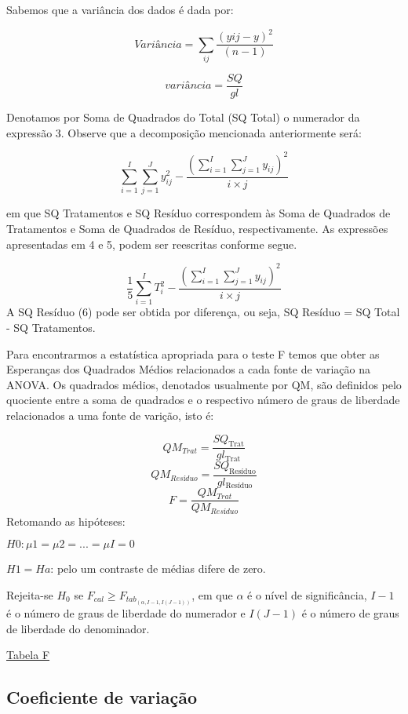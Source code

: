 \documentclass[
]{book}
\begin{document}
Sabemos que a variância dos dados é dada por:

\[Variância = \sum _{ij} \frac{(yij−y)^2}{(n−1)}\]

\[variância = \displaystyle{\frac{SQ}{gl}}\]

Denotamos por Soma de Quadrados do Total (SQ Total) o numerador da expressão 3. Observe que a decomposição mencionada anteriormente será:

\[\displaystyle{\sum_{i=1}^I\sum_{j=1}^Jy_{ij}^2-\frac{\left(\sum_{i=1}^I\sum_{j=1}^Jy_{ij}\right)^2}{i\times j}}\]

em que SQ Tratamentos e SQ Resíduo correspondem às Soma de Quadrados de Tratamentos e Soma de Quadrados de Resíduo, respectivamente.
As expressões apresentadas em 4 e 5, podem ser reescritas conforme segue.

\[\displaystyle{\frac{1}{5}\sum_{i=1}^I T_i^2 - \frac{\left(\sum_{i=1}^I\sum_{j=1}^Jy_{ij}\right)^2}{i\times j}}\]
A SQ Resíduo (6) pode ser obtida por diferença, ou seja,
SQ Resíduo = SQ Total - SQ Tratamentos.

Para encontrarmos a estatística apropriada para o teste F temos que obter as Esperanças dos Quadrados Médios relacionados a cada fonte de variação na ANOVA.
Os quadrados médios, denotados usualmente por QM, são definidos pelo quociente entre a soma de quadrados e o respectivo número de graus de liberdade relacionados a uma fonte de varição, isto é:

\[QM_{Trat} = \displaystyle{\frac{SQ_\text{Trat}}{gl_\text{Trat}}}\]
\[QM_{Resíduo} = \displaystyle{\frac{SQ_\text{Resíduo}}{gl_\text{Resíduo}}}\]
\[F = \displaystyle{\frac{QM_{Trat}}{QM_{Resíduo}}}\]
Retomando as hipóteses:

\(H0 : \mu1 = \mu2 = ... = \mu I = 0\)

\(H1 = Ha\): pelo um contraste de médias difere de zero.

Rejeita-se \(H_0\) se \(F_{cal} \geq F_{tab_{(\alpha, I-1, I(J-1))}}\), em que \(\alpha\) é o nível de significância, \(I-1\) é o número de graus de liberdade do numerador e \(I(J-1)\) é o número de graus de liberdade do denominador.

\href{https://docs.ufpr.br/~vayego/pedeefes/tab_sned.pdf}{Tabela F}

\hypertarget{coeficiente-de-variauxe7uxe3o-1}{%
\subsection{Coeficiente de variação}\label{coeficiente-de-variauxe7uxe3o-1}}
\end{document}
